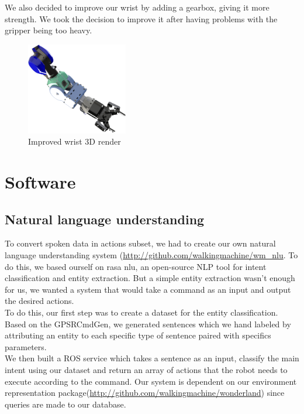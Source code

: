 \documentclass[runningheads,a4paper]{llncs}
\begin{document}
We also decided to improve our wrist by adding a gearbox, giving it more strength. We took the decision to improve it after having problems with the gripper being too heavy. 

\begin{figure}
  \centering
  \includegraphics[width=125pt]{images/wrist.png}
  \caption{Improved wrist 3D render}
\end{figure} 

\newpage
\section{Software}

\subsection{Natural language understanding}

\tab To convert spoken data in actions subset, we had to create our own natural language understanding system (\href{http://github.com/walkingmachine/wm\_nlu}{http://github.com/walkingmachine/wm\_nlu}. To do this, we based ourself on rasa nlu\cite{rasa}, an open-source NLP tool for intent classification and entity extraction. But a simple entity extraction wasn't enough for us, we wanted a system that would take a command as an input and output the desired actions.\\

To do this, our first step was to create a dataset for the entity classification. Based on the GPSRCmdGen, we generated sentences which we hand labeled by attributing an entity to each specific type of sentence paired with specifics parameters.\\

We then built a ROS service which takes a sentence as an input, classify the main intent using our dataset and return an array of actions that the robot needs to execute according to the command. Our system is dependent on our environment representation package(\href{http://github.com/walkingmachine/wonderland}{http://github.com/walkingmachine/wonderland}) since queries are made to our database.
\end{document}
